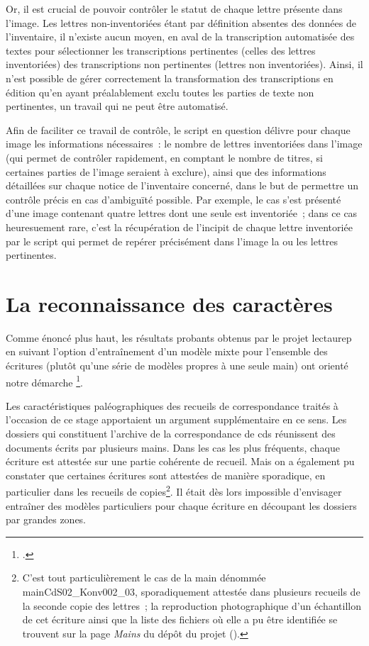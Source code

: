\documentclass[a4paper,12pt,twoside]{book}
\begin{document}
	    		Or, il est crucial de pouvoir contrôler le statut de chaque lettre présente dans l'image. Les lettres non-inventoriées étant par définition absentes des données de l'inventaire, il n'existe aucun moyen, en aval de la transcription automatisée des textes pour sélectionner les transcriptions pertinentes (celles des lettres inventoriées) des transcriptions non pertinentes (lettres non inventoriées). Ainsi, il n'est possible de gérer correctement la transformation des transcriptions en édition qu'en ayant préalablement exclu toutes les parties de texte non pertinentes, un travail qui ne peut être automatisé.
	    		
	    		Afin de faciliter ce travail de contrôle, le script en question délivre pour chaque image les informations nécessaires~: le nombre de lettres inventoriées dans l'image (qui permet de contrôler rapidement, en comptant le nombre de titres, si certaines parties de l'image seraient à exclure), ainsi que des informations détaillées sur chaque notice de l'inventaire concerné, dans le but de permettre un contrôle précis en cas d'ambiguïté possible. Par exemple, le cas s'est présenté d'une image contenant quatre lettres dont une seule est inventoriée~; dans ce cas heuresuement rare, c'est la récupération de l'incipit de chaque lettre inventoriée par le script qui permet de repérer précisément dans l'image la ou les lettres pertinentes.
				
		\section{La reconnaissance des caractères}
			Comme énoncé plus haut, les résultats probants obtenus par le projet \gls{lectaurep} en suivant l'option d'entraînement d'un modèle mixte pour l'ensemble des écritures (plutôt qu'une série de modèles propres à une seule main) ont orienté notre démarche \footcite{chagueCreationModelesTranscriptiona}.
			
			Les caractéristiques paléographiques des recueils de correspondance traités à l'occasion de ce stage apportaient un argument supplémentaire en ce sens. Les dossiers qui constituent l'archive de la correspondance de \gls{cds} réunissent des documents écrits par plusieurs mains. Dans les cas les plus fréquents, chaque écriture est attestée sur une partie cohérente de recueil. Mais on a également pu constater que certaines écritures sont attestées de manière sporadique, en particulier dans les recueils de copies\footnote{C'est tout particulièrement le cas de la main dénommée mainCdS02\_Konv002\_03, sporadiquement attestée dans plusieurs recueils de la seconde copie des lettres~; la reproduction photographique d'un échantillon de cet écriture ainsi que la liste des fichiers où elle a pu être identifiée se trouvent sur la page \textit{Mains} du dépôt du projet (\cite{biayMains2022}).}. Il était dès lors impossible d'envisager entraîner des modèles particuliers pour chaque écriture en découpant les dossiers par grandes zones.
			
\end{document}

